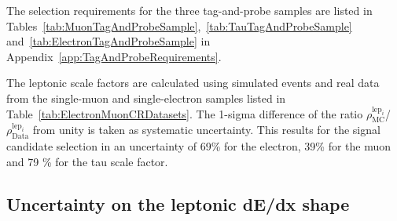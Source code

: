 The selection requirements for the three tag-and-probe samples are listed in Tables~\ref{tab:MuonTagAndProbeSample},~\ref{tab:TauTagAndProbeSample} and~\ref{tab:ElectronTagAndProbeSample} in Appendix~\ref{app:TagAndProbeRequirements}.

The leptonic scale factors are calculated using simulated \Zlep events and real data from the single-muon and single-electron samples listed in Table~\ref{tab:ElectronMuonCRDatasets}.
The 1-sigma difference of the ratio $\rho^{\text{lep}_i}_{\text{MC}}$/$\rho^{\text{lep}_i}_{\text{Data}}$ from unity is taken as systematic uncertainty. 
This results for the signal candidate selection in an uncertainty of 69\% for the electron, 39\% for the muon and 79 \% for the tau scale factor.

\subsection{Uncertainty on the leptonic dE/dx shape}
\label{sec:LeptonIasUncertainty}

